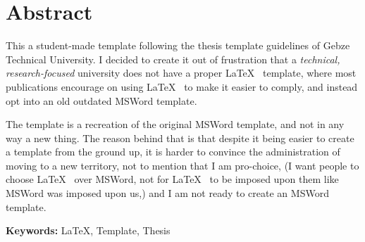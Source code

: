 \chapter*{Abstract}

This a student-made template following the thesis template guidelines of Gebze Technical University\cite{gtustyle}. I decided to create it out of frustration that a \emph{technical, research-focused} university does not have a proper \LaTeX~ template, where most publications encourage on using \LaTeX~ to make it easier to comply, and instead opt into an old outdated MSWord template.

The template is a recreation of the original MSWord template, and not in any way a new thing. The reason behind that is that despite it being easier to create a template from the ground up, it is harder to convince the administration of moving to a new territory, not to mention that I am pro-choice, (I want people to choose \LaTeX~ over MSWord, not for \LaTeX~ to be imposed upon them like MSWord was imposed upon us,) and I am not ready to create an MSWord template.


\vfill
\textbf{Keywords:} \LaTeX, Template, Thesis 
\clearpage